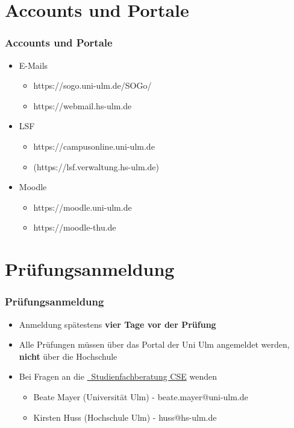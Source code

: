 \documentclass[10pt,a4paper]{beamer}
\begin{document}
    \section{Accounts und Portale}
    \begin{frame}
        \frametitle{Accounts und Portale}
        \vfill
        \begin{itemize}
            \item E-Mails
            \vfill
            \begin{itemize}
                \item https://sogo.uni-ulm.de/SOGo/
                \vfill
                \item https://webmail.hs-ulm.de
            \end{itemize}
            \vfill
            \item LSF
            \vfill
            \begin{itemize}
                \item https://campusonline.uni-ulm.de
                \vfill
                \item (https://lsf.verwaltung.hs-ulm.de)
            \end{itemize}
            \vfill
            \item Moodle
            \vfill
            \begin{itemize}
                \item https://moodle.uni-ulm.de
                \vfill
                \item https://moodle-thu.de
            \end{itemize}
        \end{itemize}
        \vfill
    \end{frame}


    \section{Prüfungsanmeldung}
    \begin{frame}
        \frametitle{Prüfungsanmeldung}
        \vfill
        \begin{itemize}
            \item Anmeldung spätestens \textbf{vier Tage vor der Prüfung}
            \vfill
            \item Alle Prüfungen müssen über das Portal der Uni Ulm angemeldet werden, \textbf{nicht} über die Hochschule
            \vfill
            \item Bei Fragen an die \href{https://www.uni-ulm.de/mawi/mawi-cse/studienfachberatung/}{\color{ecs100}\Mundus~Studienfachberatung CSE} wenden
            \vfill
            \begin{itemize}
                \item Beate Mayer (Universität Ulm) - beate.mayer@uni-ulm.de
                \vfill
                \item Kirsten Huss (Hochschule Ulm) - huss@hs-ulm.de
            \end{itemize}
        \end{itemize}
        \vfill
    \end{frame}
\end{document}
